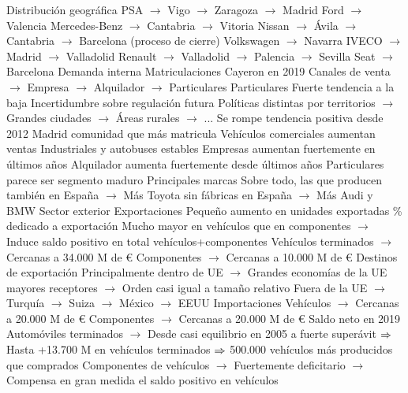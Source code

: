 \documentclass{nuevotema}
\begin{document}
\begin{esquemal}
				\4 Distribución geográfica
				\4[] PSA
				\4[] $\to$ Vigo
				\4[] $\to$ Zaragoza
				\4[] $\to$ Madrid
				\4[] Ford
				\4[] $\to$ Valencia
				\4[] Mercedes-Benz
				\4[] $\to$ Cantabria
				\4[] $\to$ Vitoria
				\4[] Nissan
				\4[] $\to$ Ávila
				\4[] $\to$ Cantabria
				\4[] $\to$ Barcelona (proceso de cierre)
				\4[] Volkswagen
				\4[] $\to$ Navarra
				\4[] IVECO
				\4[] $\to$ Madrid
				\4[] $\to$ Valladolid
				\4[] Renault
				\4[] $\to$ Valladolid
				\4[] $\to$ Palencia
				\4[] $\to$ Sevilla
				\4[] Seat
				\4[] $\to$ Barcelona
			\3 Demanda interna
				\4 Matriculaciones
				\4[] Cayeron en 2019
				\4[] Canales de venta
				\4[] $\to$ Empresa
				\4[] $\to$ Alquilador
				\4[] $\to$ Particulares
				\4 Particulares
				\4[] Fuerte tendencia a la baja
				\4[] Incertidumbre sobre regulación futura
				\4[] Políticas distintas por territorios
				\4[] $\to$ Grandes ciudades
				\4[] $\to$ Áreas rurales
				\4[] $\to$ ...
				\4 Se rompe tendencia positiva desde 2012
				\4 Madrid comunidad que más matricula
				\4 Vehículos comerciales aumentan ventas
				\4 Industriales y autobuses estables
				\4 Empresas aumentan fuertemente en últimos años
				\4 Alquilador aumenta fuertemente desde últimos años
				\4 Particulares parece ser segmento maduro
				\4 Principales marcas
				\4[] Sobre todo, las que producen también en España
				\4[] $\to$ Más Toyota sin fábricas en España
				\4[] $\to$ Más Audi y BMW
			\3 Sector exterior
				\4 Exportaciones
				\4[] Pequeño aumento en unidades exportadas
				\% dedicado a exportación
				\4[] Mucho mayor en vehículos que en componentes
				\4[] $\to$ Induce saldo positivo en total vehículos+componentes
				\4[] Vehículos terminados
				\4[] $\to$ Cercanas a 34.000 M de €
				\4[] Componentes
				\4[] $\to$ Cercanas a 10.000 M de €
				\4 Destinos de exportación
				\4[] Principalmente dentro de UE
				\4[] $\to$ Grandes economías de la UE mayores receptores
				\4[] $\to$ Orden casi igual a tamaño relativo
				\4[] Fuera de la UE
				\4[] $\to$ Turquía
				\4[] $\to$ Suiza
				\4[] $\to$ México
				\4[] $\to$ EEUU
				\4 Importaciones
				\4[] Vehículos
				\4[] $\to$ Cercanas a 20.000 M de €
				\4[] Componentes
				\4[] $\to$ Cercanas a 20.000 M de €
				\4 Saldo neto en 2019
				\4[] Automóviles terminados
				\4[] $\to$ Desde casi equilibrio en 2005 a fuerte superávit
				\4[] $\Rightarrow$ Hasta +13.700 M en vehículos terminados
				\4[] $\Rightarrow$ 500.000 vehículos más producidos que comprados
				\4[] Componentes de vehículos
				\4[] $\to$ Fuertemente deficitario
				\4[] $\to$ Compensa en gran medida el saldo positivo en vehículos

\end{esquemal}
\end{document}
